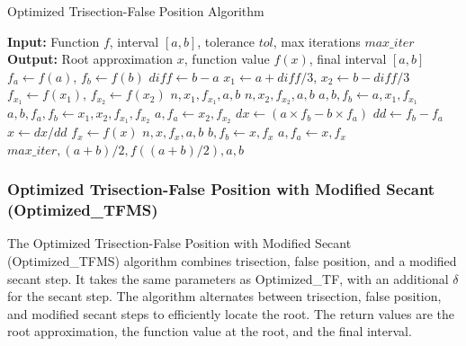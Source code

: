 \documentclass[reprint, amsmath, amssymb, aps, prl]{revtex4-2}
\begin{document}
\vspace{1em}
\begin{algorithm}[h!]
\caption{Optimized Trisection-False Position Algorithm}
\begin{algorithmic}[1]
\State \textbf{Input:} Function $f$, interval $[a, b]$, tolerance $tol$, max iterations $max\_iter$
\State \textbf{Output:} Root approximation $x$, function value $f(x)$, final interval $[a, b]$
\State $f_a \gets f(a)$, $f_b \gets f(b)$
    \State $diff \gets b - a$
    \State $x_1 \gets a + diff/3$, $x_2 \gets b - diff/3$
    \State $f_{x_1} \gets f(x_1)$, $f_{x_2} \gets f(x_2)$
        \State \Return $n, x_1, f_{x_1}, a, b$
    \EndIf
        \State \Return $n, x_2, f_{x_2}, a, b$
    \EndIf
        \State $a, b, f_b \gets a, x_1, f_{x_1}$
        \State $a, b, f_a, f_b \gets x_1, x_2, f_{x_1}, f_{x_2}$
    \Else
        \State $a, f_a \gets x_2, f_{x_2}$
    \EndIf
    \State $dx \gets (a \times f_b - b \times f_a)$
    \State $dd \gets f_b - f_a$
    \State $x \gets dx / dd$
    \State $f_x \gets f(x)$
        \State \Return $n, x, f_x, a, b$
    \EndIf
        \State $b, f_b \gets x, f_x$
    \Else
        \State $a, f_a \gets x, f_x$
    \EndIf
\EndFor
\State \Return $max\_iter, (a + b)/2, f((a + b)/2), a, b$
\end{algorithmic}
\end{algorithm}
\vspace{1em}

\subsubsection{Optimized Trisection-False Position with Modified Secant (Optimized\_TFMS)}

The Optimized Trisection-False Position with Modified Secant (Optimized\_TFMS) algorithm combines trisection, false position, and a modified secant step. It takes the same parameters as Optimized\_TF, with an additional $\delta$ for the secant step. The algorithm alternates between trisection, false position, and modified secant steps to efficiently locate the root. The return values are the root approximation, the function value at the root, and the final interval.
\end{document}
